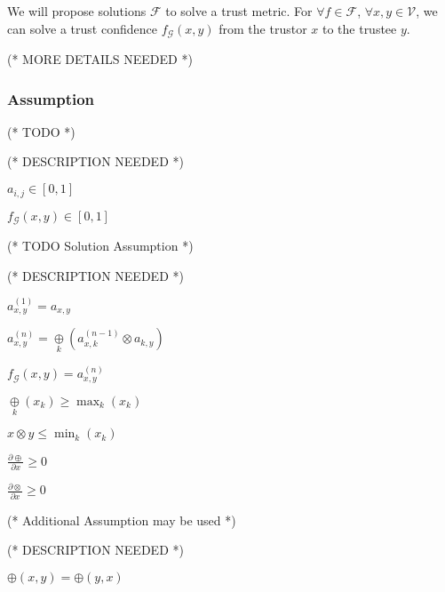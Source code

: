 \documentclass{article}
\begin{document}
We will propose solutions \(\mathcal{F}\) to solve a trust metric. For \(\forall f\in \mathcal{F}\), \(\forall x,y\in \mathcal{V}\), we can solve
a trust confidence \(f_{\mathcal{G}}(x,y)\) from the trustor \(x\) to the trustee \(y\).



(* MORE DETAILS NEEDED *)


\subsubsection{Assumption}





(* TODO *)



(* DESCRIPTION NEEDED *)


\item \(a_{i,j}\in [0,1]\)


\item \(f_{\mathcal{G}}(x,y)\in [0,1]\)



(* TODO Solution Assumption *)



(* DESCRIPTION NEEDED *)


\item \(a_{x,y}^{(1)}=a_{x,y}\)


\item \(a_{x,y}^{(n)}=\underset{k}{\oplus }\left(a_{x,k}^{(n-1)}\otimes a_{k,y}\right)\)


\item \(f_{\mathcal{G}}(x,y)=a_{x,y}^{(n)}\)


\item \(\underset{k}{\oplus }\left(x_k\right)\geqslant \max _k\left(x_k\right)\)


\item \(x\otimes y\leqslant \min _k\left(x_k\right)\)


\item \(\frac{\partial \oplus }{\partial x}\geqslant 0\)


\item \(\frac{\partial \otimes }{\partial x}\geqslant 0\)



(* Additional Assumption may be used *)



(* DESCRIPTION NEEDED *)


\item \(\oplus (x,y)=\oplus (y,x)\)
\end{document}
